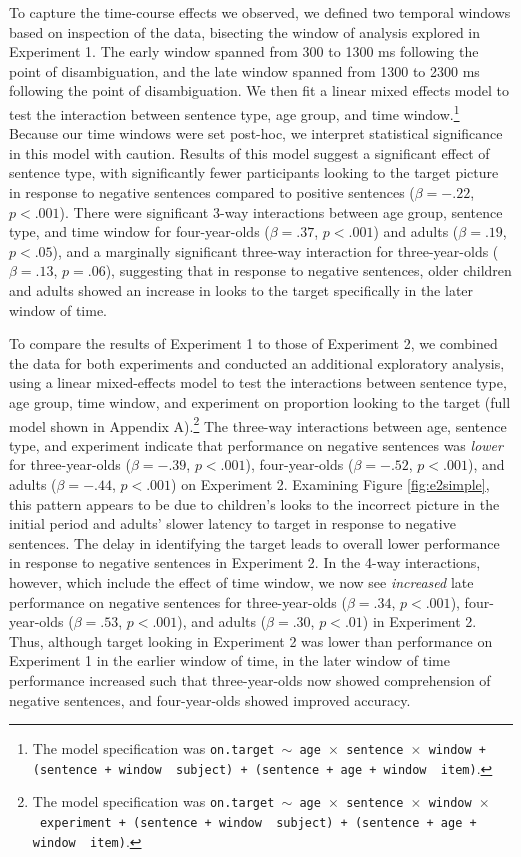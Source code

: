\documentclass[man]{apa2}
\begin{document}
To capture the time-course effects we observed, we defined two temporal windows based on inspection of the data, bisecting the window of analysis explored in Experiment 1. The early window spanned from 300 to 1300 ms following the point of disambiguation, and the late window spanned from 1300 to 2300 ms following the point of disambiguation. We then fit a linear mixed effects model to test the interaction between sentence type, age group, and time window.\footnote{The model specification was \texttt{on.target $\sim$ age~$\times$~sentence~$\times$~window + (sentence + window~\textbar~subject) +  (sentence + age + window~\textbar~item)}.} Because our time windows were set post-hoc, we interpret statistical significance in this model with caution.  Results of this model suggest a significant effect of sentence type, with significantly fewer participants looking to the target picture in response to negative sentences compared to positive sentences ($\beta = -.22$, $p < .001$).   There were significant 3-way interactions between age group, sentence type, and time window for four-year-olds ($\beta = .37$, $p  < .001$) and adults  ($\beta = .19$, $p <.05$), and a marginally significant three-way interaction for three-year-olds ($\beta = .13$, $p =.06$), suggesting that in response to negative sentences, older children and adults showed an increase in looks to the target specifically in the later window of time. 

To compare the results of Experiment 1 to those of Experiment 2, we combined the data for both experiments and conducted an additional exploratory analysis, using a linear mixed-effects model to test the interactions between sentence type, age group, time window, and experiment on proportion looking to the target (full model shown in Appendix A).\footnote{The model specification was \texttt{on.target $\sim$ age~$\times$~sentence~$\times$~window~$\times$~experiment + (sentence + window~\textbar~subject) +  (sentence + age + window~\textbar~item)}.} The three-way interactions between age, sentence type, and experiment indicate that performance on negative sentences was \emph{lower} for three-year-olds ($\beta = - .39$, $p  < .001$), four-year-olds ($\beta = -.52$, $p <  .001$), and adults ($\beta = -.44$, $p  < .001$) on Experiment 2.  Examining Figure \ref{fig:e2simple}, this pattern appears to be due to children's looks to the incorrect picture in the initial period and adults' slower latency to target in response to negative sentences.  The delay in identifying the target leads to overall lower performance in response to negative sentences in Experiment 2.  In the 4-way interactions, however, which include the effect of time window, we now see \emph{increased} late performance on negative sentences for three-year-olds ($\beta = .34$, $p < .001$), four-year-olds ($\beta = .53$, $p < .001$), and adults ($\beta = .30$, $p <  .01$) in Experiment 2.  Thus, although target looking in Experiment 2 was lower than performance on Experiment 1 in the earlier window of time, in the later window of time performance increased such that three-year-olds now showed comprehension of negative sentences, and four-year-olds showed improved accuracy.  
\end{document}
